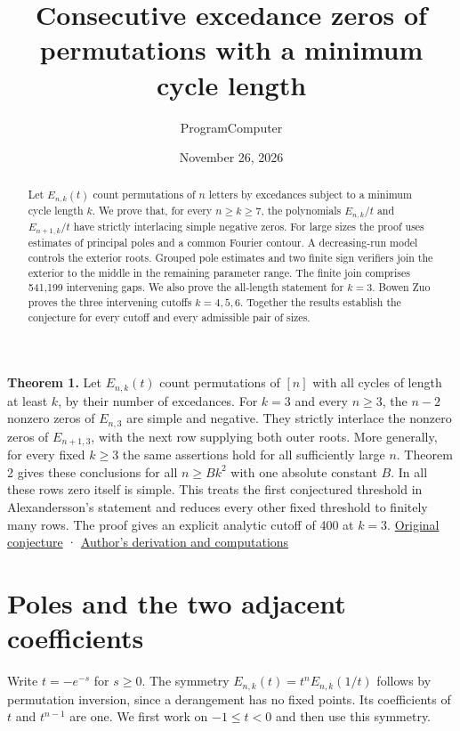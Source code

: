 \documentclass[11pt]{article}
\title{Consecutive excedance zeros of permutations with a minimum cycle length}
\author{ProgramComputer}
\date{November 26, 2026}
\begin{document}
\maketitle
\begin{abstract}
Let $E_{n,k}(t)$ count permutations of $n$ letters by excedances subject to a minimum cycle length $k$. We prove that, for every $n\ge k\ge7$, the polynomials $E_{n,k}/t$ and $E_{n+1,k}/t$ have strictly interlacing simple negative zeros. For large sizes the proof uses estimates of principal poles and a common Fourier contour. A decreasing-run model controls the exterior roots. Grouped pole estimates and two finite sign verifiers join the exterior to the middle in the remaining parameter range. The finite join comprises 541,199 intervening gaps. We also prove the all-length statement for $k=3$. Bowen Zuo proves the three intervening cutoffs $k=4,5,6$. Together the results establish the conjecture for every cutoff and every admissible pair of sizes.
\end{abstract}
\textbf{Theorem 1.} Let $E_{n,k}(t)$ count permutations of $[n]$ with all cycles of length at least $k$, by their number of excedances. For $k=3$ and every $n\ge3$, the $n-2$ nonzero zeros of $E_{n,3}$ are simple and negative. They strictly interlace the nonzero zeros of $E_{n+1,3}$, with the next row supplying both outer roots. More generally, for every fixed $k\ge3$ the same assertions hold for all sufficiently large $n$. Theorem 2 gives these conclusions for all $n\ge Bk^2$ with one absolute constant $B$. In all these rows zero itself is simple. This treats the first conjectured threshold in Alexandersson’s statement and reduces every other fixed threshold to finitely many rows. The proof gives an explicit analytic cutoff of 400 at $k=3$. \href{https://www.symmetricfunctions.com/realRootedOpenProblems.htm\#conjLongCycleExcedances}{Original conjecture} · \href{https://github.com/PerAlexandersson/RealRooted/issues/2590\#issuecomment-7059794955}{Author’s derivation and computations}

\section{Poles and the two adjacent coefficients}

Write $t=-e^{-s}$ for $s\ge0$. The symmetry $E_{n,k}(t)=t^n E_{n,k}(1/t)$ follows by permutation inversion, since a derangement has no fixed points. Its coefficients of $t$ and $t^{n-1}$ are one. We first work on $-1\le t<0$ and then use this symmetry.
\end{document}
